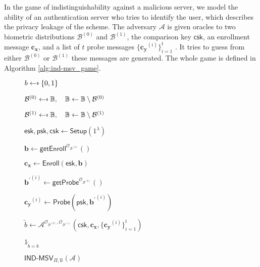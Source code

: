 In the game of indistinguishability against a malicious server, we model the ability of an authentication server who tries to identify the user, which describes the privacy leakage of the scheme. The adversary $\mathcal{A}$ is given oracles to two biometric distributions $\mathcal{B}^{(0)}$ and $ \mathcal{B}^{(1)}$, the comparison key $\textsf{csk}$, an enrollment message $\mathbf{c_x}$, and a list of $t$ probe messages $\{ \mathbf{c_y}^{(i)} \}_{i=1}^t$ . It tries to guess from either $\mathcal{B}^{(0)}$ or $ \mathcal{B}^{(1)}$ these messages are generated. The whole game is defined in Algorithm \ref{alg:ind-msv_game}.

\begin{figure}[h]
\centering

	\begin{minipage}[t]{0.55\textwidth}
	\begin{algorithm}[H]
	\caption{$\textsf{IND-MSV}_{\Pi, \mathbb{B}}(\mathcal{A})$}
	\label{alg:ind-msv_game}
	\begin{algorithmic}[1]
		\State $b \getsdollar \{0, 1\}$

		\State $\mathcal{B}^{(0)} \getsdollar \mathbb{B}, \quad \mathbb{B} \gets \mathbb{B} \setminus \mathcal{B}^{(0)}$

		\State $\mathcal{B}^{(1)} \getsdollar \mathbb{B}, \quad \mathbb{B} \gets \mathbb{B} \setminus \mathcal{B}^{(1)}$

		\State $\textsf{esk}, \textsf{psk}, \textsf{csk} \gets \textsf{Setup}(1^\lambda)$

		\State $\mathbf{b} \gets \textsf{getEnroll}^{\mathcal{O}_{\mathcal{B}^{(b)}}}()$

		\State $\mathbf{c_x} \gets \textsf{Enroll}(\textsf{esk}, \mathbf{b})$


			\State ${\mathbf{b}^\prime}^{(i)} \gets \textsf{getProbe}^{\mathcal{O}_{\mathcal{B}^{(b)}}}() $
		
			\State $\mathbf{c_y}^{(i)} \gets \textsf{Probe}( \textsf{psk}, {\mathbf{b}^\prime}^{(i)} )$

		\EndFor

		

		
			\State $\tilde{b} \gets \mathcal{A}^{\mathcal{O}_{\mathcal{B}^{(0)}}, \mathcal{O}_{\mathcal{B}^{(1)}}} ( \textsf{csk}, \mathbf{c_x}, \{ \mathbf{c_y}^{(i)} \}_{i=1}^t )$

		\State \Return $1_{\tilde{b} = b}$
	\end{algorithmic}
	\end{algorithm}
	\end{minipage}

\label{fig:ind-msv_game}
\end{figure}

